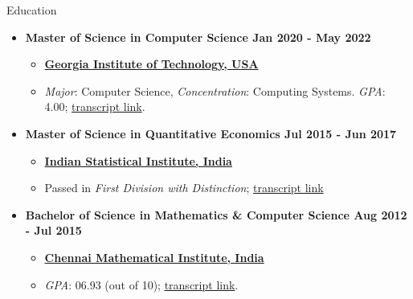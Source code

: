 \documentclass[]{mcdowellcv}
\begin{document}
\begin{cvsection}{Education}
  \hfill
  \begin{itemize}
    \item
          \textbf{Master of Science in Computer Science \hfill Jan 2020 - May 2022}
          \begin{itemize}
            \item
                  \textbf{\href{https://www.gatech.edu/}{Georgia Institute of Technology, USA}}
            \item
                  \textit{Major}: Computer Science, \textit{Concentration}: Computing Systems. \textit{GPA}: 4.00;
                  \href{https://drive.google.com/file/d/1rG1vO2I3fK_aVtkboU8p6I_6vYUQBlf9/view?usp=sharing}{transcript link}.
          \end{itemize}
    \item
          \textbf{Master of Science in Quantitative Economics \hfill Jul 2015 - Jun 2017}
          \begin{itemize}
            \item
                  \textbf{\href{https://www.isical.ac.in/}{Indian Statistical Institute, India}}
            \item
                  Passed in \textit{First Division with Distinction};
                  \href{https://drive.google.com/file/d/1b0q9SZj-vi8_KwSI1X1aQ1qtAroeXgw0/view?usp=sharing}{transcript link}
          \end{itemize}
    \item
          \textbf{Bachelor of Science in Mathematics \& Computer Science \hfill Aug 2012 - Jul 2015}
          \begin{itemize}
            \item
                  \textbf{\href{https://www.cmi.ac.in/}{Chennai Mathematical Institute, India}}
            \item
                  \textit{GPA}: 06.93 (out of 10); \href{https://drive.google.com/file/d/1azLzpG9HNLKuCWK21QHGjXc02za2fGW3/view?usp=sharing}{transcript
                    link}.
          \end{itemize}
  \end{itemize}
\end{cvsection}
\end{document}
